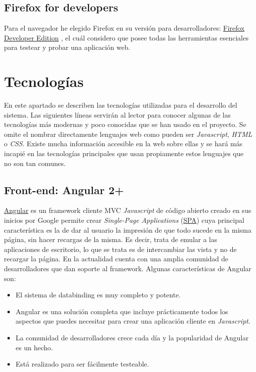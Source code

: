 


\subsection{Firefox for developers}\label{herramientas_firefox}
Para el navegador he elegido Firefox en su versión para desarrolladores: \href{https://www.mozilla.org/es-ES/firefox/developer}{Firefox Developer Edition} , el cuál considero que posee todas las herramientas esenciales para testear y probar una aplicación web.



\section{Tecnologías}\label{tecnologias}
 En este apartado se describen las tecnologías utilizadas para el desarrollo del sistema. Las siguientes líneas servirán al lector para conocer algunas de las tecnologías más modernas y poco conocidas que se han usado en el proyecto. Se omite el nombrar directamente lenguajes web como pueden ser \emph{Javascript}, \emph{HTML} o \emph{CSS}. Existe mucha información accesible en la web sobre ellas y se hará más incapié en las tecnologías principales que usan propiamente estos lenguajes que no son tan comunes.
 
 \subsection{Front-end: Angular 2+}\label{tecnologias_angular}
 \href{https://angular.io}{Angular} es un framework cliente MVC \emph{Javascript} de código abierto creado en sus inicios por Google permite crear  \emph{Single-Page Applications} (\href{https://es.wikipedia.org/wiki/Single-page_application}{SPA})  cuya principal característica es la de dar al usuario la impresión de que todo sucede en la misma página, sin hacer recargas de la misma. Es decir, trata de emular a las aplicaciones de escritorio, lo que se trata es de intercambiar las vista y no de recargar la página. En la actualidad cuenta con una amplia comunidad de desarrolladores  que dan soporte al framework.  Algunas características de Angular son:
 
\begin{itemize}
\tightlist
\item
  El sistema de databinding es muy completo y potente.
\item
  Angular es una solución completa que incluye prácticamente todos los aspectos que puedes necesitar para crear una aplicación cliente en \emph{Javascript}. 
\item
  La comunidad de desarrolladores crece cada día y la popularidad de Angular es un hecho.
  \item
  Está realizado para ser fácilmente testeable.
\end{itemize}
 

